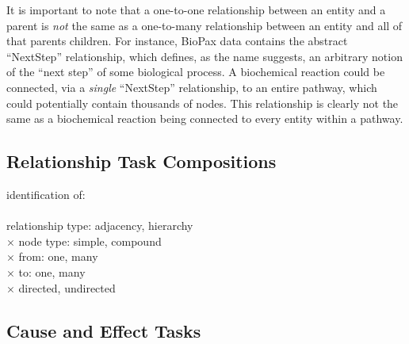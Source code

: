 \documentclass{egpubl}
\begin{document}
It is important to note that a one-to-one relationship between an entity and a parent is \textit{not} the same as a one-to-many relationship between an entity and all of that parents children.
For instance, BioPax data contains the abstract ``NextStep'' relationship, which defines, as the name suggests, an arbitrary notion of the ``next step'' of some biological process.
A biochemical reaction could be connected, via a \textit{single} ``NextStep'' relationship, to an entire pathway, which could potentially contain thousands of nodes.
This relationship is clearly not the same as a biochemical reaction being connected to every entity within a pathway.

\subsection{Relationship Task Compositions}

identification of:
\\
\\
relationship type: adjacency, hierarchy
\\ $\times$
node type: simple, compound
\\ $\times$
from: one, many
\\ $\times$
to: one, many
\\ $\times$
directed, undirected


\subsection{Cause and Effect Tasks}
\end{document}
